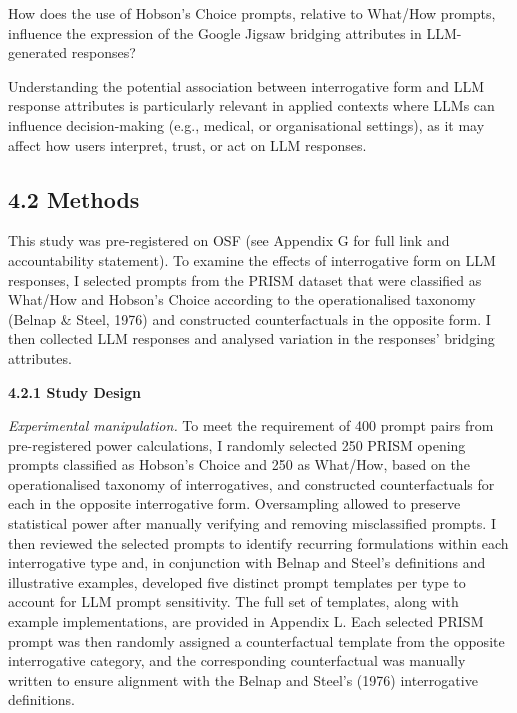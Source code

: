 \documentclass[
  12pt,
]{article}
\begin{document}
\begin{adjustwidth}{2em}{2em}
How does the use of Hobson’s Choice prompts, relative to What/How prompts, influence the expression of the Google Jigsaw bridging attributes in LLM-generated responses?
\end{adjustwidth}

Understanding the potential association between interrogative form and LLM response attributes is particularly relevant in applied contexts where LLMs can influence decision-making (e.g., medical, or organisational settings), as it may affect how users interpret, trust, or act on LLM responses.

\subsection{4.2 Methods}\label{methods-1}

This study was pre-registered on OSF (see Appendix G for full link and accountability statement). To examine the effects of interrogative form on LLM responses, I selected prompts from the PRISM dataset that were classified as What/How and Hobson's Choice according to the operationalised taxonomy (Belnap \& Steel, 1976) and constructed counterfactuals in the opposite form. I then collected LLM responses and analysed variation in the responses' bridging attributes.

\textbf{4.2.1 Study Design}

\emph{Experimental manipulation.} To meet the requirement of 400 prompt pairs from pre-registered power calculations, I randomly selected 250 PRISM opening prompts classified as Hobson's Choice and 250 as What/How, based on the operationalised taxonomy of interrogatives, and constructed counterfactuals for each in the opposite interrogative form. Oversampling allowed to preserve statistical power after manually verifying and removing misclassified prompts. I then reviewed the selected prompts to identify recurring formulations within each interrogative type and, in conjunction with Belnap and Steel's definitions and illustrative examples, developed five distinct prompt templates per type to account for LLM prompt sensitivity. The full set of templates, along with example implementations, are provided in Appendix L. Each selected PRISM prompt was then randomly assigned a counterfactual template from the opposite interrogative category, and the corresponding counterfactual was manually written to ensure alignment with the Belnap and Steel's (1976) interrogative definitions.
\end{document}
